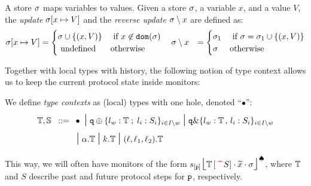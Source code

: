 \documentclass[runningheads]{llncs}
\newcommand{\erase}[1]{#1}
\begin{document}
\begin{definition} \label{d:store}
A store $\sigma$ maps variables to values. Given a store $\sigma$, a variable $x$, and a value $V$, 
the \emph{update} $\sigma[x\mapsto V]$ and the 
 \emph{reverse update} $\sigma\setminus x$ are defined as:
\begin{align*}
\sigma[x\mapsto V] & = \begin{cases}
\sigma\cup \{(x,V)\} &\text{ if } x\not\in \mathtt{dom}(\sigma) \\ 
\text{ undefined }  & \text{otherwise}
\end{cases} 
\quad
\sigma\setminus x & =  \begin{cases}
\sigma_1 &\text{ if } \sigma=\sigma_1\cup \{(x,V)\} \\ 
\sigma  & \text{otherwise}
\end{cases} 
\end{align*}
\end{definition}

\noindent Together with local types with history, the following notion of type context allows us to keep the current protocol state inside monitors: 
\begin{definition} 
 We define 
\textit{type contexts} as (local) types with one hole, denoted ``$\bullet$'':
\begin{align*}
 \ctx{T},\ctx{S}   \bnfis  &  \bullet  \erase{\sbnfbar
 \q\btsel{\lbl_w:\ctx{T} \;;\; \lbl_i:S_i}_{i \in I\setminus w} \sbnfbar \q\btbra{\lbl_w:\ctx{T} \, , \, \lbl_i:S_i}_{i \in I\setminus w}}
 \\
  &\sbnfbar   \alpha.\ctx{T} \sbnfbar    k.\ctx{T} \sbnfbar (\loc,\loc_1,\loc_2).\ctx{T} 
\end{align*}
\end{definition}
This way, we will often have monitors of the form
${s_{[\mathtt{p}]}\mbox{{\Large $\lfloor$}} \textcolor{black}{{\mathbb{T}\left[\textcolor{black}{\,\textcolor{magenta}{\text{\textbf{\textasciicircum\!\!\textasciicircum}}} S}\right]}}\cdot \widetilde{x}\cdot \sigma \mbox{{\Large $\rfloor$}}^{\spadesuit}}$, where  
$\mathbb{T}$ and $S$ describe past and future protocol steps for $\mathtt{p}$, respectively.
\end{document}

